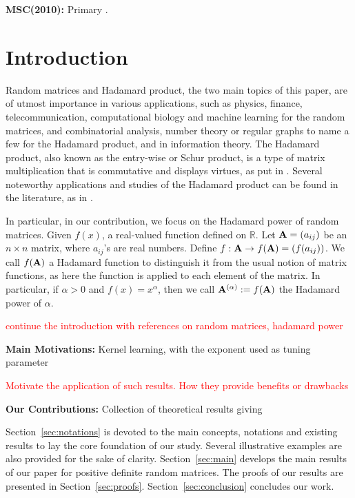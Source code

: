 \documentclass[conference,letterpaper]{IEEEtran}
\numberwithin{equation}{section}
\newcommand{\bd}{\bold}
\begin{document}
\noindent\textbf{MSC(2010):} Primary .\\
[0.5cm]


\section{Introduction}
Random matrices and Hadamard product, the two main topics of this paper, are of utmost importance in various applications, such as physics, finance, telecommunication, computational biology and machine learning for the random matrices, and combinatorial analysis, number theory or regular graphs to name a few for the Hadamard product, and in information theory.
The Hadamard product, also known as the entry-wise or Schur product, is a type of matrix multiplication that is commutative and displays  virtues, as put in \cite{horadam2012hadamard}. 
Several noteworthy applications and studies of the Hadamard product can be found in the literature, as in \cite{hedayat1978hadamard,agaian2006hadamard,bulutoglu2009counterexample,audenaert2010spectral}.

In particular, in our contribution, we focus on the Hadamard power of random matrices. 
Given $f(x)$, a real-valued function defined on $\mathbb{R}.$ Let $\bd{A}=(a_{ij})$ be an $n\times n$ matrix, where $a_{ij}$'s are real numbers.  Define $f: \bd{A} \rightarrow f(\bd{A)}=(f(a_{i j}))$. We call $f(\bd{A})$  a Hadamard function to distinguish it from the usual notion of matrix functions, as here the function is applied to each element of the matrix. 
In particular, if $\alpha>0$ and  $f(x)=x^{\alpha}$, then we call  $\bd{A}^{(\alpha)}:=f(\bd{A})$ the Hadamard power of $\alpha$. 

\textcolor{red}{continue the introduction with references on random matrices, hadamard power}

\textbf{Main Motivations: }
Kernel learning, with the exponent used as tuning parameter

\textcolor{red}{Motivate the application of such results. How they provide benefits or drawbacks}

\textbf{Our Contributions: }
Collection of theoretical results giving 


Section~\ref{sec:notations} is devoted to the main concepts, notations and existing results to lay the core foundation of our study.
Several illustrative examples are also provided for the sake of clarity.
Section~\ref{sec:main} develops the main results of our paper for positive definite random matrices.
The proofs of our results are presented in Section~\ref{sec:proofs}.
Section~\ref{sec:conclusion} concludes our work.
\end{document}
